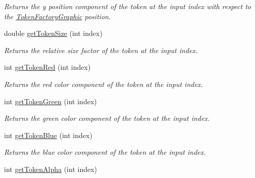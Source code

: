 \begin{DoxyCompactItemize}
\begin{DoxyCompactList}\small\item\em Returns the y position component of the token at the input index with respect to the \hyperlink{class_picto_1_1_token_factory_graphic}{Token\-Factory\-Graphic} position. \end{DoxyCompactList}\item 
\hypertarget{class_picto_1_1_token_factory_graphic_a12732f912a9a52419bb4d970b5d4be25}{double \hyperlink{class_picto_1_1_token_factory_graphic_a12732f912a9a52419bb4d970b5d4be25}{get\-Token\-Size} (int index)}\label{class_picto_1_1_token_factory_graphic_a12732f912a9a52419bb4d970b5d4be25}

\begin{DoxyCompactList}\small\item\em Returns the relative size factor of the token at the input index. \end{DoxyCompactList}\item 
\hypertarget{class_picto_1_1_token_factory_graphic_a3b006bdcbab87ac92366ac7b0d7b87a7}{int \hyperlink{class_picto_1_1_token_factory_graphic_a3b006bdcbab87ac92366ac7b0d7b87a7}{get\-Token\-Red} (int index)}\label{class_picto_1_1_token_factory_graphic_a3b006bdcbab87ac92366ac7b0d7b87a7}

\begin{DoxyCompactList}\small\item\em Returns the red color component of the token at the input index. \end{DoxyCompactList}\item 
\hypertarget{class_picto_1_1_token_factory_graphic_a317e89e70d4313ab072a1ef6b9b6589f}{int \hyperlink{class_picto_1_1_token_factory_graphic_a317e89e70d4313ab072a1ef6b9b6589f}{get\-Token\-Green} (int index)}\label{class_picto_1_1_token_factory_graphic_a317e89e70d4313ab072a1ef6b9b6589f}

\begin{DoxyCompactList}\small\item\em Returns the green color component of the token at the input index. \end{DoxyCompactList}\item 
\hypertarget{class_picto_1_1_token_factory_graphic_a08dafe716427dab8360c029bb1dd4a95}{int \hyperlink{class_picto_1_1_token_factory_graphic_a08dafe716427dab8360c029bb1dd4a95}{get\-Token\-Blue} (int index)}\label{class_picto_1_1_token_factory_graphic_a08dafe716427dab8360c029bb1dd4a95}

\begin{DoxyCompactList}\small\item\em Returns the blue color component of the token at the input index. \end{DoxyCompactList}\item 
\hypertarget{class_picto_1_1_token_factory_graphic_afcb0082711e2b8503bc2a1c9df861f6f}{int \hyperlink{class_picto_1_1_token_factory_graphic_afcb0082711e2b8503bc2a1c9df861f6f}{get\-Token\-Alpha} (int index)}\label{class_picto_1_1_token_factory_graphic_afcb0082711e2b8503bc2a1c9df861f6f}


\end{DoxyCompactItemize}

